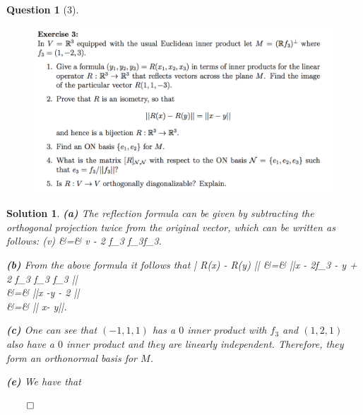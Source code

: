 \documentclass{article} %
\def\eQb#1\eQe{\begin{eqnarray*}#1\end{eqnarray*}}
\theoremstyle{quest}
\newtheorem*{question}{Question}
\newtheorem*{solution}{Solution}
\begin{document}
\begin{question}[3]
\hfill
\begin{figure}[h!]
  \centering
    \includegraphics[width=1\textwidth]{LA-4-3.png}
\end{figure}
\end{question}
\begin{solution}
\textbf{(a)}
The reflection formula can be given by subtracting the orthogonal projection twice from
the original vector, which can be written as follows:
\eQb
R(v) &=& v - 2 {f_3 \cdot f_3}f_3.
\eQe

\smallskip

\textbf{(b)} From the above formula it follows that
\eQb
|| R(x) - R(y) || &=& ||x - 2f_3 - y + 2
{f_3 \cdot f_3} f_3 || \\
&=& ||x -y - 2 || \\
&=& || x- y||.
\eQe 

\smallskip

\textbf{(c)}
One can see that $(-1,1,1)$ has a $0$ inner product with $f_3$ and $(1,2,1)$ also have a $0$ inner
product and they are linearly independent. Therefore, they form an orthonormal basis for $M$.

\textbf{(e)}
We have that 

\hfill $\qed$

\end{solution}

\newpage
\end{document}

